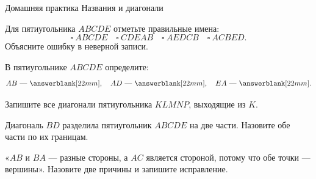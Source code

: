 \worksheettitle
  {Домашняя практика}
  { Названия и диагонали}

\studentnameblock

\begin{practicebox}
  Для пятиугольника $ABCDE$ отметьте правильные имена:
  \[
    \square\ ABCDE\quad
    \square\ CDEAB\quad
    \square\ AEDCB\quad
    \square\ ACBED.
  \]
  Объясните ошибку в неверной записи. 
\end{practicebox}

\begin{practicebox}
  В пятиугольнике $ABCDE$ определите:
  \[
    AB\text{ --- }\answerblank[22mm],\quad
    AD\text{ --- }\answerblank[22mm],\quad
    EA\text{ --- }\answerblank[22mm].
  \]
\end{practicebox}

\begin{practicebox}
  Запишите все диагонали пятиугольника $KLMNP$, выходящие из $K$.
  \answerblank[80mm]
\end{practicebox}

\begin{practicebox}[4. Разбиение]
  Диагональ $BD$ разделила пятиугольник $ABCDE$ на две части.
  Назовите обе части по их границам. 
\end{practicebox}

\begin{warningbox}
  «$AB$ и $BA$ --- разные стороны, а $AC$ является стороной, потому что
  обе точки --- вершины». Назовите две причины и запишите исправление.
\end{warningbox}
